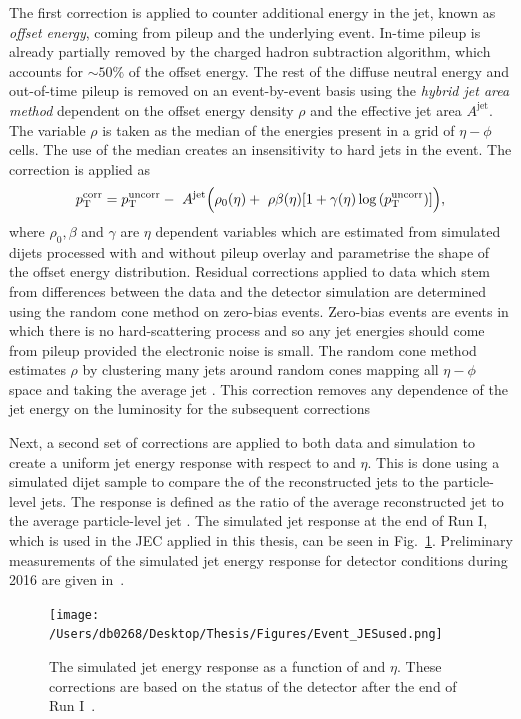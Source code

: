 The first correction is applied to counter additional energy in the jet, known as \textit{offset energy}, coming from pileup and the underlying event. 
In-time pileup is already partially removed by the charged hadron subtraction algorithm, which accounts for $\sim50\%$ of the offset energy.
The rest of the diffuse neutral energy and out-of-time pileup is removed on an event-by-event basis using the \textit{hybrid jet area method} dependent on the offset energy density $\rho$ and the effective jet area $A^{\mathrm{jet}}$.
The variable $\rho$ is taken as the median of the energies present in a grid of $\eta - \phi$ cells.
The use of the median creates an insensitivity to hard jets in the event.   
The correction is applied as
\begin{equation}
	\pt^{\mathrm{corr}} = \pt^{\mathrm{uncorr}} - \
	A^{\mathrm{jet}}\Big(\rho_{0}(\eta) + \
	\rho\beta(\eta)[1+\gamma(\eta)\log{(\pt^{\mathrm{uncorr}})]\Big)},
\end{equation}
where $\rho_{0}, \beta$ and $\gamma$ are $\eta$ dependent variables which are estimated from simulated \QCD{} dijets processed with and without pileup overlay and parametrise the shape of the offset energy distribution.
Residual corrections applied to data which stem from differences between the data and the detector simulation are determined using the random cone method on zero-bias events.
Zero-bias events are events in which there is no hard-scattering process and so any jet energies should come from pileup provided the electronic noise is small.
The random cone method estimates $\rho$ by clustering many jets around random cones mapping all $\eta-\phi$ space and taking the average jet \pt{}.
This correction removes any dependence of the jet energy on the luminosity for the subsequent corrections 

Next, a second set of corrections are applied to both data and simulation to create a uniform jet energy response with respect to \pt{} and $\eta$.
This is done using a simulated \QCD{} dijet sample to compare the \pt{} of the reconstructed jets to the particle-level jets.
The response is defined as the ratio of the average reconstructed jet \pt{} to the average particle-level jet \pt{}.
The simulated jet response at the end of Run I, which is used in the JEC applied in this thesis, can be seen in Fig.~\ref{fig:JES}.
Preliminary measurements of the simulated jet energy response for detector conditions during 2016 are given in~\cite{Event:JEC2016RunII}.
\begin{figure}[htpb!]
	\centering
	\texttt{[image: /Users/db0268/Desktop/Thesis/Figures/Event\_JESused.png]}
	\caption[The simulated jet energy response as a function of \pt{} and $\eta$. These corrections are based on the status of the detector after the end of Run I.]{The simulated jet energy response as a function of \pt{} and $\eta$. These corrections are based on the status of the detector after the end of Run I~\cite{Event:JEC}.}
	\label{fig:JES}
\end{figure}

